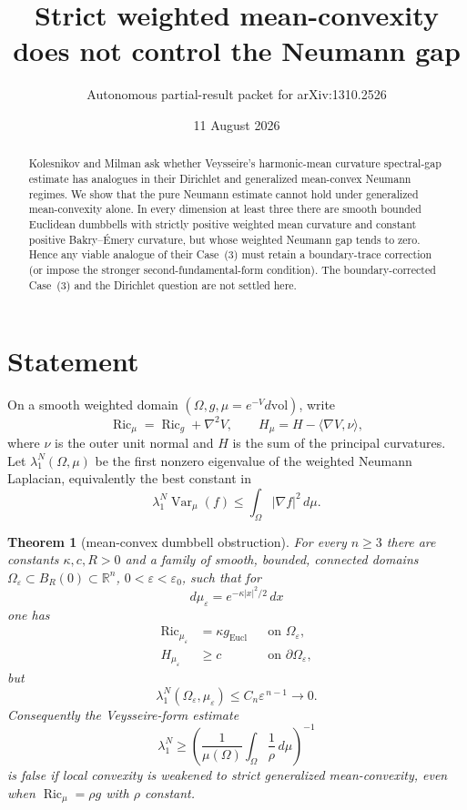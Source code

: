\documentclass[11pt]{article}
\title{Strict weighted mean-convexity does not control the Neumann gap}
\author{Autonomous partial-result packet for arXiv:1310.2526}
\date{11 August 2026}
\newtheorem{theorem}{Theorem}
\newcommand{\Ric}{\operatorname{Ric}}
\newcommand{\Var}{\operatorname{Var}}
\begin{document}
\maketitle

\begin{abstract}
Kolesnikov and Milman ask whether Veysseire's harmonic-mean curvature
spectral-gap estimate has analogues in their Dirichlet and generalized
mean-convex Neumann regimes.  We show that the pure Neumann estimate cannot
hold under generalized mean-convexity alone.  In every dimension at least
three there are smooth bounded Euclidean dumbbells with strictly positive
weighted mean curvature and constant positive Bakry--\'Emery curvature, but
whose weighted Neumann gap tends to zero.  Hence any viable analogue of their
Case~(3) must retain a boundary-trace correction (or impose the stronger
second-fundamental-form condition).  The boundary-corrected Case~(3) and the
Dirichlet question are not settled here.
\end{abstract}

\section{Statement}

On a smooth weighted domain $(\Omega,g,\mu=e^{-V}d\mathrm{vol})$, write
\[
 \Ric_\mu=\Ric_g+\nabla^2V,\qquad
 H_\mu=H-\langle\nabla V,\nu\rangle ,
\]
where $\nu$ is the outer unit normal and $H$ is the sum of the principal
curvatures.  Let $\lambda_1^N(\Omega,\mu)$ be the first nonzero eigenvalue of
the weighted Neumann Laplacian, equivalently the best constant in
\[
 \lambda_1^N\Var_\mu(f)\leq\int_\Omega|\nabla f|^2\,d\mu.
\]

\begin{theorem}[mean-convex dumbbell obstruction]\label{thm:main}
For every $n\geq3$ there are constants $\kappa,c,R>0$ and a family of smooth,
bounded, connected domains $\Omega_\varepsilon\subset B_R(0)\subset\mathbb
R^n$, $0<\varepsilon<\varepsilon_0$, such that for
\[
 d\mu_\varepsilon=e^{-\kappa|x|^2/2}\,dx
\]
one has
\begin{align*}
 \Ric_{\mu_\varepsilon}&=\kappa g_{\mathrm{Eucl}}
       &&\text{on }\Omega_\varepsilon,\\
 H_{\mu_\varepsilon}&\geq c
       &&\text{on }\partial\Omega_\varepsilon,
\end{align*}
but
\[
 \lambda_1^N(\Omega_\varepsilon,\mu_\varepsilon)
 \leq C_n\varepsilon^{\,n-1}\longrightarrow0.
\]
Consequently the Veysseire-form estimate
\begin{equation}\label{eq:false}
 \lambda_1^N\geq
 \left(\frac1{\mu(\Omega)}\int_\Omega\frac1\rho\,d\mu\right)^{-1}
\end{equation}
is false if local convexity is weakened to strict generalized
mean-convexity, even when $\Ric_\mu=\rho g$ with $\rho$ constant.
\end{theorem}
\end{document}
